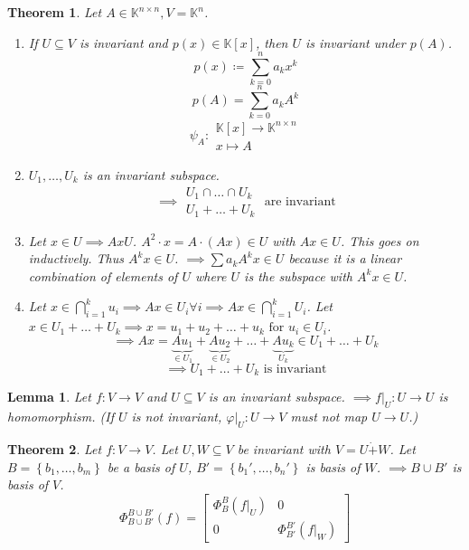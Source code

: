 \documentclass{article}
\newtheorem{theorem}{Theorem}  \numberwithin{theorem}{section}
\newtheorem{lemma}{Lemma}  \numberwithin{lemma}{section}
\newcommand{\set}[1]{\left\{#1\right\}}
\begin{document}
\begin{theorem} %
  \label{s113}
  Let $A \in \mathbb K^{n\times n}, V = \mathbb K^n$.
  \begin{enumerate}
    \item If $U \subseteq V$ is invariant and $p(x) \in \mathbb K[x]$, then $U$ is invariant under $p(A)$.
      \[ p(x) \coloneqq \sum_{k=0}^n a_k x^k \]
      \[ p(A) = \sum_{k=0}^n a_k A^k \]
      \[ \psi_A: \substack{\mathbb K[x] \to \mathbb K^{n\times n} \\ x \mapsto A} \]
    \item $U_1, \dots, U_k$ is an invariant subspace.
      \[ \implies \substack{U_1 \cap \dots \cap U_k \\ U_1 + \dots + U_k} \text{ are invariant} \]
    \item Let $x \in U \implies Ax U$. $A^2 \cdot x = A \cdot (Ax) \in U$ with $Ax \in U$. This goes on inductively. Thus $A^k x \in U$. $\implies \sum a_k A^k x \in U$ because it is a linear combination of elements of $U$ where $U$ is the subspace with $A^k x \in U$.
    \item Let $x \in \bigcap_{i=1}^k u_i \implies Ax \in U_i \forall i \implies Ax \in \bigcap_{i=1}^k U_i$.
      Let $x \in U_1 + \dots + U_k \implies x = u_1 + u_2 + \dots + u_k \text{ for } u_i \in U_i$.
      \[ \implies Ax = \underbrace{Au_1}_{\in U_1} + \underbrace{Au_2}_{\in U_2} + \dots + \underbrace{Au_k}_{U_k} \in U_1 + \dots + U_k \]
      \[ \implies U_1 + \dots + U_k \text{ is invariant} \]
  \end{enumerate}
\end{theorem}

\begin{lemma} %
  Let $f: V \to V$ and $U \subseteq V$ is an invariant subspace.
  $\implies f|_U: U \to U$ is homomorphism.
  (If $U$ is not invariant, $\varphi|_U: U \to V$ must not map $U \to U$.)
\end{lemma}

\begin{theorem} %
  Let $f: V \to V$. Let $U, W \subseteq V$ be invariant with $V = U \dot+ W$.
  Let $B = \set{b_1, \dots, b_m}$ be a basis of $U$, $B' = \set{b_1', \dots, b_n'}$ is basis of $W$.
  $\implies B \cup B'$ is basis of $V$.
  \[
    \Phi_{B\cup B'}^{B\cup B'}(f) = \left[\begin{array}{c|c}
      \Phi_B^B(f|_U) & 0 \\
    \hline
      0 & \Phi_{B'}^{B'}(f|_W)
    \end{array}\right]
  \]
\end{theorem}
\end{document}
